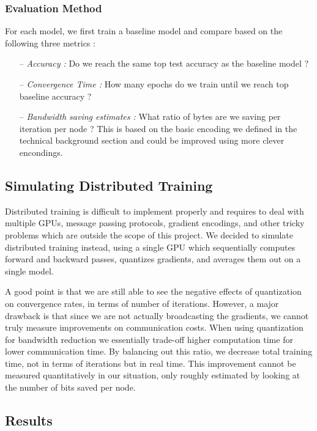 \documentclass[10pt,conference,compsocconf]{IEEEtran}
\begin{document}
\subsubsection{Evaluation Method}

For each model, we first train a baseline model and compare based on the following three metrics :

\begin{itemize}
	\item[--] \textit{Accuracy :} Do we reach the same top test accuracy as the baseline model ?
	\item[--] \textit{Convergence Time :} How many epochs do we train until we reach top baseline accuracy ?
	\item[--] \textit{Bandwidth saving estimates :} What ratio of bytes are we saving per iteration per node ? This is based on the basic encoding we defined in the technical background section and could be improved using more clever encondings.
\end{itemize}

\subsection{Simulating Distributed Training}

Distributed training is difficult to implement properly and requires to deal with multiple GPUs, message passing protocols, gradient encodings, and other tricky problems which are outside the scope of this project. We decided to simulate distributed training instead, using a single GPU which sequentially computes forward and backward passes, quantizes gradients, and averages them out on a single model. 

A good point is that we are still able to see the negative effects of quantization on convergence rates, in terms of number of iterations. However, a major drawback is that since we are not actually broadcasting the gradients, we cannot truly measure improvements on communication costs. When using quantization for bandwidth reduction we essentially trade-off higher computation time for lower communication time. By balancing out this ratio, we decrease total training time, not in terms of iterations but in real time. This improvement cannot be measured quantitatively in our situation, only roughly estimated by looking at the number of bits saved per node.


\subsection{Results}
\end{document}
